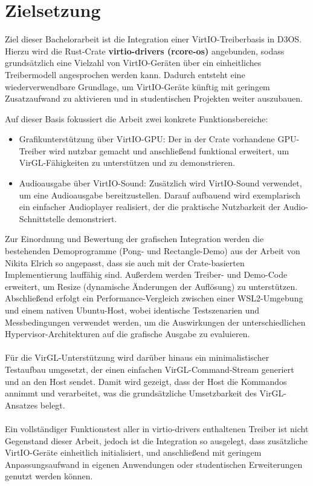 \clearpage

\section{Zielsetzung}

Ziel dieser Bachelorarbeit ist die Integration einer VirtIO-Treiberbasis in D3OS. Hierzu wird die Rust-Crate \textbf{virtio-drivers (rcore-os)} \cite{rcore_virtio} angebunden, sodass grundsätzlich eine Vielzahl von VirtIO-Geräten über ein einheitliches Treibermodell angesprochen werden kann. Dadurch entsteht eine wiederverwendbare Grundlage, um VirtIO-Geräte künftig mit geringem Zusatzaufwand zu aktivieren und in studentischen Projekten weiter auszubauen.

Auf dieser Basis fokussiert die Arbeit zwei konkrete Funktionsbereiche:

\begin{itemize}
    \item Grafikunterstützung über VirtIO-GPU: Der in der Crate vorhandene GPU-Treiber wird nutzbar gemacht und anschließend funktional erweitert, um VirGL-Fähigkeiten zu unterstützen und zu demonstrieren.
    \item Audioausgabe über VirtIO-Sound: Zusätzlich wird VirtIO-Sound verwendet, um eine Audioausgabe bereitzustellen. Darauf aufbauend wird exemplarisch ein einfacher Audioplayer realisiert, der die praktische Nutzbarkeit der Audio-Schnittstelle demonstriert.
\end{itemize}

Zur Einordnung und Bewertung der grafischen Integration werden die bestehenden Demoprogramme (Pong- und Rectangle-Demo) aus der Arbeit von Nikita Elrich so angepasst, dass sie auch mit der Crate-basierten Implementierung lauffähig sind. Außerdem werden Treiber- und Demo-Code erweitert, um Resize (dynamische Änderungen der Auflösung) zu unterstützen. Abschließend erfolgt ein Performance-Vergleich zwischen einer WSL2-Umgebung und einem nativen Ubuntu-Host, wobei identische Testszenarien und Messbedingungen verwendet werden, um die Auswirkungen der unterschiedlichen Hypervisor-Architekturen auf die grafische Ausgabe zu evaluieren.\\
\\
Für die VirGL-Unterstützung wird darüber hinaus ein minimalistischer Testaufbau umgesetzt, der einen einfachen VirGL-Command-Stream generiert und an den Host sendet. Damit wird gezeigt, dass der Host die Kommandos annimmt und verarbeitet, was die grundsätzliche Umsetzbarkeit des VirGL-Ansatzes belegt.\\
\\
Ein vollständiger Funktionstest aller in virtio-drivers enthaltenen Treiber ist nicht Gegenstand dieser Arbeit, jedoch ist die Integration so ausgelegt, dass zusätzliche VirtIO-Geräte einheitlich initialisiert, und anschließend mit geringem Anpassungsaufwand in eigenen Anwendungen oder studentischen Erweiterungen genutzt werden können.

